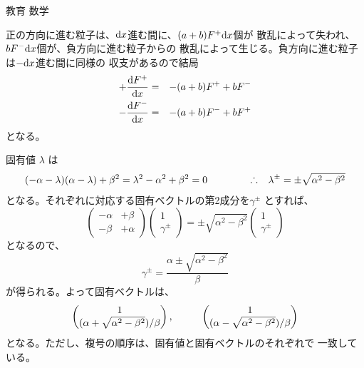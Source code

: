 \documentclass[fleqn]{jbook}
\begin{document}
\begin{answer}{教育 数学}{}
\begin{subanswers}
\begin{subsubanswers}
  \end{subsubanswers}


\SubAnswer
  \begin{subsubanswers}
  \SubSubAnswer
    正の方向に進む粒子は、${\rm d}x$進む間に、$(a+b)F^+{\rm d}x$個が
    散乱によって失われ、$bF^-{\rm d}x$個が、負方向に進む粒子からの
    散乱によって生じる。負方向に進む粒子は$-{\rm d}x$進む間に同様の
    収支があるので結局
%
    \begin{eqnarray*}
      +{\frac{{\rm d} F^+}{{\rm d} x}} &=& -(a+b)F^+ + bF^- \\
      -{\frac{{\rm d} F^-}{{\rm d} x}} &=& -(a+b)F^- + bF^+
    \end{eqnarray*}
%
    となる。

  \SubSubAnswer
    固有値 $\lambda$ は
%
    \[(-\alpha-\lambda)(\alpha-\lambda)+\beta^2=\lambda^2-\alpha^2+\beta^2=0 \hspace{15mm} \Yueni \lambda^{\pm}=\pm\sqrt{\alpha^2-\beta^2} \]
%
    となる。それぞれに対応する固有ベクトルの第2成分を$\gamma^{\pm}$
    とすれば、
%
    \[ \begin{pmatrix}%
         -\alpha & +\beta \\
         -\beta  & +\alpha
       \end{pmatrix}%
       \begin{pmatrix}%
          1 \\ \gamma^{\pm}
       \end{pmatrix}%
       = \pm\sqrt{\alpha^2-\beta^2}%
       \begin{pmatrix}%
          1 \\ \gamma^{\pm}
       \end{pmatrix} \]
%
    となるので、
%
    \[ \gamma^{\pm}=\frac{\alpha\pm\sqrt{\alpha^2-\beta^2}}{\beta} \]
%
    が得られる。よって固有ベクトルは、
%
    \[ \begin{pmatrix}%
         1 \\ (\alpha+\sqrt{\alpha^2-\beta^2})/\beta
       \end{pmatrix}%
       ,\hspace{10mm}%
       \begin{pmatrix}%
         1 \\ (\alpha-\sqrt{\alpha^2-\beta^2})/\beta
       \end{pmatrix} \]
%
    となる。ただし、複号の順序は、固有値と固有ベクトルのそれぞれで
    一致している。


\end{subsubanswers}
\end{subanswers}
\end{answer}
\end{document}
